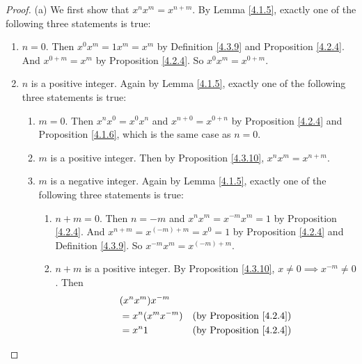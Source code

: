 \begin{proof}{(a)}
    We first show that \(x^n x^m = x^{n + m}\).
    By Lemma \ref{4.1.5}, exactly one of the following three statements is true:
    \begin{enumerate}[label=(\Roman*)]
        \item \(n = 0\).
              Then \(x^0 x^m = 1x^m = x^m\) by Definition \ref{4.3.9} and Proposition \ref{4.2.4}.
              And \(x^{0 + m} = x^m\) by Proposition \ref{4.2.4}.
              So \(x^0 x^m = x^{0 + m}\).
        \item \(n\) is a positive integer.
              Again by Lemma \ref{4.1.5}, exactly one of the following three statements is true:
              \begin{enumerate}[label=(\roman*)]
                  \item \(m = 0\).
                        Then \(x^n x^0 = x^0 x^n\) and \(x^{n + 0} = x^{0 + n}\) by Proposition \ref{4.2.4} and Proposition \ref{4.1.6}, which is the same case as \(n = 0\).
                  \item \(m\) is a positive integer.
                        Then by Proposition \ref{4.3.10}, \(x^n x^m = x^{n + m}\).
                  \item \(m\) is a negative integer.
                        Again by Lemma \ref{4.1.5}, exactly one of the following three statements is true:
                        \begin{enumerate}[label=(\arabic*)]
                            \item \(n + m = 0\).
                                  Then \(n = -m\) and \(x^n x^m = x^{-m} x^m = 1\) by Proposition \ref{4.2.4}.
                                  And \(x^{n + m} = x^{(-m) + m} = x^0 = 1\) by Proposition \ref{4.2.4} and Definition \ref{4.3.9}.
                                  So \(x^{-m} x^m = x^{(-m) + m}\).
                            \item \(n + m\) is a positive integer.
                                  By Proposition \ref{4.3.10}, \(x \neq 0 \implies x^{-m} \neq 0\).
                                  Then
                                  \begin{align*}
                                       & (x^n x^m) x^{-m}                                            \\
                                       & = x^n (x^m x^{-m})   & \text{(by Proposition \ref{4.2.4})}  \\
                                       & = x^n 1              & \text{(by Proposition \ref{4.2.4})}  \\

\end{align*}
\end{enumerate}
\end{enumerate}
\end{enumerate}
\end{proof}
